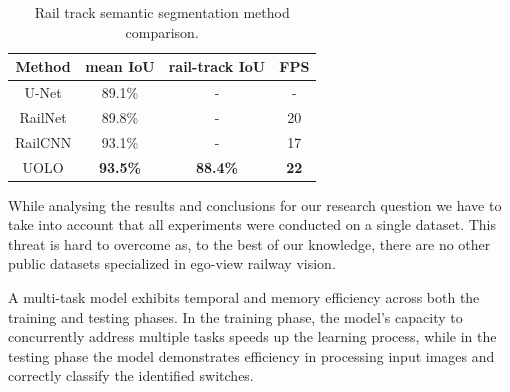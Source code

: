 \documentclass[conference]{IEEEtran}
\begin{document}
\begin{table}[h!]
\begin{center}
\caption{Rail track semantic segmentation method comparison.}
\begin{tabular}{c c c c} 
 \hline
 \textbf{Method} & \textbf{mean IoU} & \textbf{rail-track IoU} & \textbf{FPS}\\ [0.5ex] 
 \hline\hline
 U-Net \cite{katar2022automated} & 89.1\% & - & - \\ 
 RailNet \cite{wang2019railnet} & 89.8\% & - & 20 \\ 
 RailCNN \cite{belyaev2020railroad} & 93.1\% & - & 17\\
 \hline
 UOLO & \textbf{93.5\%} & \textbf{88.4\%} & \textbf{22} \\ [1ex] 
 \hline
\end{tabular}
\label{table:track_approaches}
\end{center}
\end{table}

While analysing the results and conclusions for our research question we have to take into account that all experiments were conducted on a single dataset. This threat is hard to overcome as, to the best of our knowledge, there are no other public datasets specialized in ego-view railway vision. 

A multi-task model exhibits temporal and memory efficiency across both the training and testing phases. In the training phase, the model's capacity to concurrently address multiple tasks speeds up the learning process, while in the testing phase the model demonstrates efficiency in processing input images and correctly classify the identified switches. 
\end{document}
